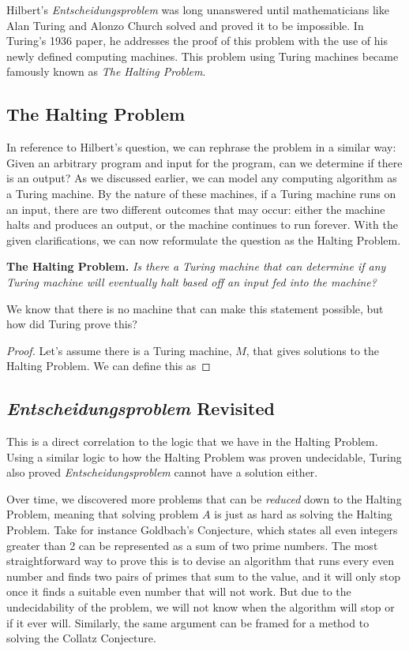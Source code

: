 \documentclass[12pt]{article}
\begin{document}
 Hilbert's \textit{Entscheidungsproblem} was long unanswered until mathematicians like Alan Turing and Alonzo Church solved and proved it to be impossible. In Turing's 1936 paper, he addresses the proof of this problem with the use of his newly defined computing machines. This problem using Turing machines became famously known as \textit{The Halting Problem}.

\subsection{The Halting Problem}

In reference to Hilbert's question, we can rephrase the problem in a similar way: Given an arbitrary program and input for the program, can we determine if there is an output? As we discussed earlier, we can model any computing algorithm as a Turing machine. By the nature of these machines, if a Turing machine runs on an input, there are two different outcomes that may occur: either the machine halts and produces an output, or the machine continues to run forever. With the given clarifications, we can now reformulate the question as the Halting Problem.\newline

\noindent \textbf{The Halting Problem.} \textit{Is there a Turing machine that can determine if any Turing machine will eventually halt based off an input fed into the machine?}\newline

\noindent We know that there is no machine that can make this statement possible, but how did Turing prove this?

\begin{proof}
Let's assume there is a Turing machine, $M$, that gives solutions to the Halting Problem. We can define this as
\newline
\end{proof}

\subsection{\textit{Entscheidungsproblem} Revisited}
This is a direct correlation to the logic that we have in the Halting Problem. Using a similar logic to how the Halting Problem was proven undecidable, Turing also proved \textit{Entscheidungsproblem} cannot have a solution either.

Over time, we discovered more problems that can be \textit{reduced} down to the Halting Problem, meaning that solving problem $A$ is just as hard as solving the Halting Problem. Take for instance Goldbach's Conjecture, which states all even integers greater than 2 can be represented as a sum of two prime numbers. The most straightforward way to prove this is to devise an algorithm that runs every even number and finds two pairs of primes that sum to the value, and it will only stop once it finds a suitable even number that will not work. But due to the undecidability of the problem, we will not know when the algorithm will stop or if it ever will. Similarly, the same argument can be framed for a method to solving the Collatz Conjecture. 
\end{document}
